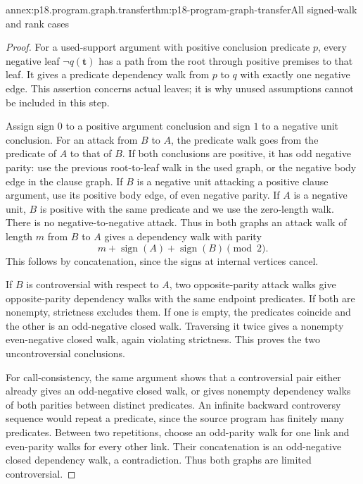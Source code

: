 \begin{annexitem}{annex:p18.program.graph.transfer}{thm:p18-program-graph-transfer}{All signed-walk and rank cases}
\begin{proof}
For a used-support argument with positive conclusion
predicate \(p\), every negative leaf \(\neg q(\mathbf t)\)
has a path from the root through positive premises
to that leaf. It gives a predicate dependency walk
from \(p\) to \(q\) with exactly one negative edge.
This assertion concerns actual leaves; it is why
unused assumptions cannot be included in this step.

Assign sign \(0\) to a positive argument conclusion
and sign \(1\) to a negative unit conclusion.
For an attack from \(B\) to \(A\), the predicate
walk goes from the predicate of \(A\) to that
of \(B\). If both conclusions are positive,
it has odd negative parity: use the previous
root-to-leaf walk in the used graph, or the
negative body edge in the clause graph.
If \(B\) is a negative unit attacking a
positive clause argument, use its positive
body edge, of even negative parity.
If \(A\) is a negative unit, \(B\) is
positive with the same predicate and we
use the zero-length walk. There is no
negative-to-negative attack. Thus in
both graphs an attack walk of length \(m\)
from \(B\) to \(A\) gives a dependency
walk with parity
\[
                         m+\operatorname{sign}(A)+\operatorname{sign}(B)\pmod2.
\]
This follows by concatenation, since the
signs at internal vertices cancel.

If \(B\) is controversial with respect
to \(A\), two opposite-parity attack
walks give opposite-parity dependency
walks with the same endpoint predicates.
If both are nonempty, strictness excludes
them. If one is empty, the predicates
coincide and the other is an odd-negative
closed walk. Traversing it twice gives
a nonempty even-negative closed walk,
again violating strictness. This proves
the two uncontroversial conclusions.

For call-consistency, the same argument
shows that a controversial pair either
already gives an odd-negative closed
walk, or gives nonempty dependency walks
of both parities between distinct
predicates. An infinite backward
controversy sequence would repeat a
predicate, since the source program
has finitely many predicates. Between
two repetitions, choose an odd-parity
walk for one link and even-parity
walks for every other link. Their
concatenation is an odd-negative
closed dependency walk, a contradiction.
Thus both graphs are limited controversial.


\end{proof}
\end{annexitem}
